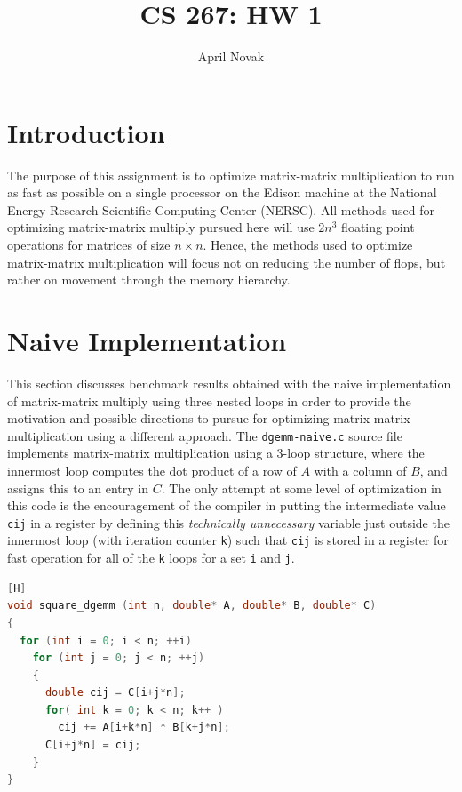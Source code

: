 \documentclass[10pt]{article}
\begin{document}
\title{CS 267: HW 1}
\author{April Novak}

\maketitle

\section{Introduction}

The purpose of this assignment is to optimize matrix-matrix multiplication to run as fast as possible on a single processor on the Edison machine at the National Energy Research Scientific Computing Center (NERSC). All methods used for optimizing matrix-matrix multiply pursued here will use \(2n^3\) floating point operations for matrices of size \(n\times n\). Hence, the methods used to optimize matrix-matrix multiplication will focus not on reducing the number of flops, but rather on movement through the memory hierarchy.

\section{Naive Implementation}

This section discusses benchmark results obtained with the naive implementation of matrix-matrix multiply using three nested loops in order to provide the motivation and possible directions to pursue for optimizing matrix-matrix multiplication using a different approach. The {\tt dgemm-naive.c} source file implements matrix-matrix multiplication using a 3-loop structure, where the innermost loop computes the dot product of a row of \(A\) with a column of \(B\), and assigns this to an entry in \(C\). The only attempt at some level of optimization in this code is the encouragement of the compiler in putting the intermediate value {\tt cij} in a register by defining this \textit{technically unnecessary} variable just outside the innermost loop (with iteration counter {\tt k}) such that {\tt cij} is stored in a register for fast operation for all of the {\tt k} loops for a set {\tt i} and {\tt j}.  

\begin{lstlisting}[language=C][H]
void square_dgemm (int n, double* A, double* B, double* C)
{
  for (int i = 0; i < n; ++i)
    for (int j = 0; j < n; ++j)
    {
      double cij = C[i+j*n];
      for( int k = 0; k < n; k++ )
        cij += A[i+k*n] * B[k+j*n];
      C[i+j*n] = cij;
    }
}
\end{lstlisting}
\end{document}
